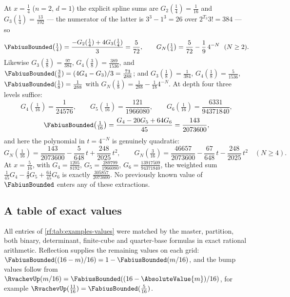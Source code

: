 \documentclass[11pt,oneside]{article}
\theoremstyle{plain}
\theoremstyle{definition}
\theoremstyle{remark}
\newcommand{\Fb}{\FabiusBounded}            %
\newcommand{\up}{\RvachevUp}                %
\newcommand{\Tr}[1]{T_{#1}}                 %
\begin{document}
At $x=\tfrac14$ ($n=2$, $d=1$) the explicit spline sums are
$G_{2}(\tfrac14)=\tfrac1{16}$ and $G_{3}(\tfrac14)=\tfrac{13}{192}$ --- the
numerator of the latter is $3^{3}-1^{3}=26$ over $2^{\Tr{3}}3!=384$ --- so
\begin{equation}
 \Fb\!\left(\tfrac14\right)=\frac{-G_{2}(\tfrac14)+4G_{3}(\tfrac14)}{3}=\frac{5}{72},
 \qquad G_{N}\!\left(\tfrac14\right)=\frac5{72}-\frac19\,4^{-N}\ \ (N\ge2).
 \label{rf:eq:examples-quarter}
\end{equation}
Likewise $G_{3}(\tfrac38)=\tfrac{97}{384}$, $G_{4}(\tfrac38)=\tfrac{389}{1536}$,
and $\Fb(\tfrac38)=(4G_{4}-G_{3})/3=\tfrac{73}{288}$; and
$G_{3}(\tfrac18)=\tfrac1{384}$, $G_{4}(\tfrac18)=\tfrac5{1536}$,
$\Fb(\tfrac18)=\tfrac1{288}$ with $G_{N}(\tfrac18)=\tfrac1{288}-\tfrac1{18}4^{-N}$.
At depth four three levels suffice:
\[
 G_{4}\!\left(\tfrac1{16}\right)=\frac{1}{24576},\qquad
 G_{5}\!\left(\tfrac1{16}\right)=\frac{121}{1966080},\qquad
 G_{6}\!\left(\tfrac1{16}\right)=\frac{6331}{94371840},
\]
\begin{equation}
 \Fb\!\left(\tfrac1{16}\right)=\frac{G_{4}-20G_{5}+64G_{6}}{45}=\frac{143}{2073600},
 \label{rf:eq:examples-sixteenth}
\end{equation}
and here the polynomial in $t=4^{-N}$ is genuinely quadratic:
\begin{equation}
 G_{N}\!\left(\tfrac1{16}\right)=\frac{143}{2073600}-\frac{5}{648}\,t+\frac{248}{2025}\,t^{2},\qquad
 G_{N}\!\left(\tfrac3{16}\right)=\frac{46657}{2073600}-\frac{67}{648}\,t-\frac{248}{2025}\,t^{2}
 \quad(N\ge4).
 \label{rf:eq:examples-sixteenth-poly}
\end{equation}
At $x=\tfrac5{16}$, with $G_{4}=\tfrac{1205}{8192}$, $G_{5}=\tfrac{289799}{1966080}$,
$G_{6}=\tfrac{13917509}{94371840}$, the weighted sum
$\tfrac1{45}G_{4}-\tfrac49G_{5}+\tfrac{64}{45}G_{6}$ is exactly
$\tfrac{305857}{2073600}$.  No previously known value of $\Fb$ enters any of
these extractions.

\subsection{A table of exact values}
\label{rf:sec:examples-table}

All entries of \cref{rf:tab:examples-values} were matched by the master,
partition, both binary, determinant, finite-cube and quarter-base formulas
in exact rational arithmetic.  Reflection supplies the remaining values on
each grid: $\Fb((16-m)/16)=1-\Fb(m/16)$, and the bump values follow from
$\up(m/16)=\Fb((16-\AbsoluteValue{m})/16)$, for example
$\up(\tfrac{11}{16})=\Fb(\tfrac5{16})$.
\end{document}
